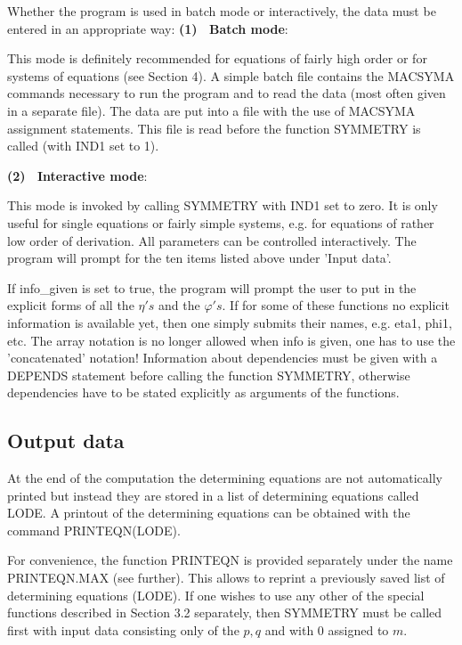 {\nopagebreak
Whether the program is used in batch mode or interactively, 
the data must be entered in an appropriate way:
\vskip 2pt
\noindent
{\bf (1) ~Batch mode}: 

\nopagebreak
This mode is definitely recommended for equations of 
fairly high order or for systems of equations (see Section 4).
A simple batch file contains the MACSYMA commands necessary 
to run the program and to read the data (most often given in a separate file). 
The data are put into a file with the use of MACSYMA assignment
statements.
This file is read before the function SYMMETRY is called (with IND1 set
to 1).

\nopagebreak
\noindent
{\bf (2) ~Interactive mode}:

\nopagebreak
This mode is invoked by calling SYMMETRY with IND1 set to zero.
It is only useful for single equations or fairly simple systems, e.g.
for equations of rather low order of derivation.
All parameters can be controlled interactively.
The program will prompt for the ten items listed above under 'Input data'.

\nopagebreak
If info\_given is set to true, the
program will prompt the user to put in the explicit forms of all the $\eta 's$
and the $\varphi 's.$ 
If for some of these functions no explicit information is available yet, 
then one simply submits their names, e.g. eta1, phi1, etc. 
The array notation is no longer allowed when info is given,
one has to use the 'concatenated' notation! 
Information about dependencies must be given with a DEPENDS statement
before calling the
function SYMMETRY, otherwise dependencies have to be stated explicitly as
arguments of the functions.

\pagebreak
\subsection{Output data}
At the end of the computation the determining equations are not 
automatically printed
but instead they are stored in a list of determining equations called LODE. 
A printout of the determining equations can be obtained with the command 
PRINTEQN(LODE).

\nopagebreak
For convenience, the function PRINTEQN is provided separately under the
name PRINTEQN.MAX (see further). 
This allows to reprint a previously saved list of 
determining equations (LODE).
If one wishes to use any other of the special functions described in 
Section 3.2 separately, then SYMMETRY must be called first with input
data consisting only of the $p, q$ and with $0$ assigned to $m$.

}

